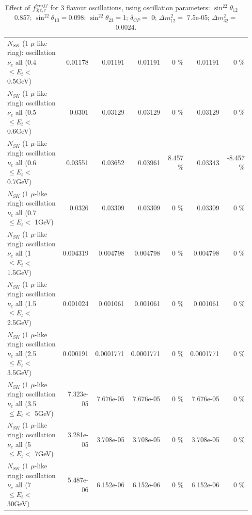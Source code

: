 \begin{table}
\begin{tabular}{| l | r | r | r  r | r  r |}
$N_{SK}$ (1 $\mu$-like ring): oscillation $\nu_{e}$ all (0.4 $\leq E_{t} <$ 0.5GeV) &         0.01178 &         0.01191 &         0.01191 &        0 \%  &         0.01191 &        0 \%  \\ 
$N_{SK}$ (1 $\mu$-like ring): oscillation $\nu_{e}$ all (0.5 $\leq E_{t} <$ 0.6GeV) &          0.0301 &         0.03129 &         0.03129 &        0 \%  &         0.03129 &        0 \%  \\ 
$N_{SK}$ (1 $\mu$-like ring): oscillation $\nu_{e}$ all (0.6 $\leq E_{t} <$ 0.7GeV) &         0.03551 &         0.03652 &         0.03961 &    8.457 \%  &         0.03343 &   -8.457 \%  \\ 
$N_{SK}$ (1 $\mu$-like ring): oscillation $\nu_{e}$ all (0.7 $\leq E_{t} <$ 1GeV) &          0.0326 &         0.03309 &         0.03309 &        0 \%  &         0.03309 &        0 \%  \\ 
$N_{SK}$ (1 $\mu$-like ring): oscillation $\nu_{e}$ all (1 $\leq E_{t} <$ 1.5GeV) &        0.004319 &        0.004798 &        0.004798 &        0 \%  &        0.004798 &        0 \%  \\ 
$N_{SK}$ (1 $\mu$-like ring): oscillation $\nu_{e}$ all (1.5 $\leq E_{t} <$ 2.5GeV) &        0.001024 &        0.001061 &        0.001061 &        0 \%  &        0.001061 &        0 \%  \\ 
$N_{SK}$ (1 $\mu$-like ring): oscillation $\nu_{e}$ all (2.5 $\leq E_{t} <$ 3.5GeV) &        0.000191 &       0.0001771 &       0.0001771 &        0 \%  &       0.0001771 &        0 \%  \\ 
$N_{SK}$ (1 $\mu$-like ring): oscillation $\nu_{e}$ all (3.5 $\leq E_{t} <$ 5GeV) &       7.323e-05 &       7.676e-05 &       7.676e-05 &        0 \%  &       7.676e-05 &        0 \%  \\ 
 $N_{SK}$ (1 $\mu$-like ring): oscillation $\nu_{e}$ all (5 $\leq E_{t} <$ 7GeV) &       3.281e-05 &       3.708e-05 &       3.708e-05 &        0 \%  &       3.708e-05 &        0 \%  \\ 
$N_{SK}$ (1 $\mu$-like ring): oscillation $\nu_{e}$ all (7 $\leq E_{t} <$ 30GeV) &       5.487e-06 &       6.152e-06 &       6.152e-06 &        0 \%  &       6.152e-06 &        0 \%  \\ 
\hline
\hline
\end{tabular}
\caption{ Effect of $f_{3; t, r}^{banff}$ for 3 flavour oscillations, using oscillation parameters:  $\sin^22\theta_{12} = $0.857; $\sin^22\theta_{13} = $0.098; $\sin^22\theta_{23} = $1; $\delta_{CP} = $        0; $\Delta m^2_{12} = $    7.5e-05; $\Delta m^2_{32} = $    0.0024. }
\label{tab:num_banff_03_1RmuT_3f_osc_t13:0.098}
\end{table}
